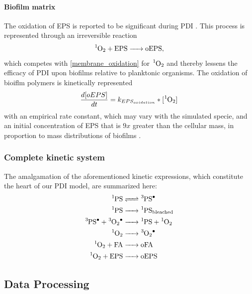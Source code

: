 \paragraph{Biofilm matrix} 
The oxidation of EPS is reported to be significant during PDI \cite{Beirao2014PhotodynamicPorphyrin}. This process is represented through an irreversible reaction
\begin{equation} \label{EPS_oxidation}
    \ce{^1O2 + EPS -> oEPS},
\end{equation}
which competes with \cref{membrane_oxidation} for $\ce{^1O2}$ and thereby lessens the efficacy of PDI upon biofilms relative to planktonic organisms. The oxidation of bioiflm polymers is kinetically represented  
\begin{equation} \label{EPS_oxidation_kinetics}
    \frac{d[oEPS]}{dt} = k_{EPS_{oxidation}}*[\ce{^1O2}]
\end{equation}
with an empirical rate constant, which may vary with the simulated specie, and an initial concentration of EPS that is $9x$ greater than the cellular mass, in proportion to mass distributions of biofilms \cite{Flemming2010TheMatrix}.

\subsubsection*{Complete kinetic system}
The amalgamation of the aforementioned kinetic expressions, which constitute the heart of our PDI model, are summarized here:
\begin{align*}
    \ce{^1PS &<=> ^3PS^.} \\
    \ce{^1PS &-> ^1PS_{bleached}} \\
    \ce{^3PS^. + ^3O2^. &-> ^1PS + ^1O2} \\
    \ce{^1O2 &-> ^3O2^.} \\
    \ce{^1O2 + FA &-> oFA} \\
    \ce{^1O2 + EPS &-> oEPS} \\
\end{align*}

\subsection*{Data Processing}

